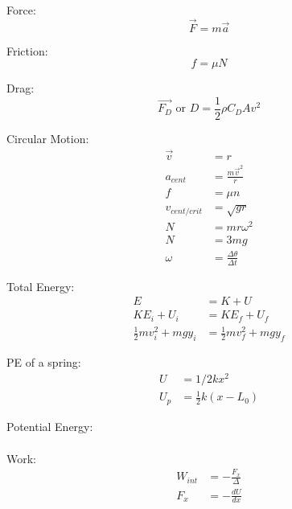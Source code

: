 \documentclass[10pt, letterpaper]{book}
\begin{document}
\begin{multicols*}{2}
        Force:
        \begin{equation}
            \vec{F} = m\vec{a}
        \end{equation}

        Friction:
        \begin{equation}
            f = \mu N
        \end{equation}

        Drag: 
        \begin{equation}
            \vec{F_D}\text{ or }D = \frac{1}{2}\rho C_{D}Av^{2}
        \end{equation}

        Circular Motion:
        \begin{align}
            \vec{v}         & = r                               \\
            a_{cent}        & =\frac{m\vec{v}^{2}}{r}           \\
            f               & = \mu n                           \\
            v_{cent/crit}   & = \sqrt{gr}                       \\
            N               & = mr\omega^{2}                    \\
            N               & = 3mg                             \\
            \omega          & = \frac{\Delta \theta}{\Delta t}  
        \end{align}

        Total Energy:
        \begin{align}
            E   & = K + U   \\
            KE_{i} + U_{i}  & = KE_{f} + U_{f}  \\
            \frac{1}{2}mv^{2}_{i} + mgy_{i} & = \frac{1}{2}mv^{2}_{f} + mgy_{f}
        \end{align}

        PE of a spring:
        \begin{align}
            U     & = 1/2kx^{2}                 \\
            U_{p} & = \frac{1}{2}k(x-L_{0})
        \end{align}

        Potential Energy:
        \begin{align}
        \end{align}

        Work:
        \begin{align}
            W_{int} & = -\frac{F_{x}}{\Delta }   \\
            F_{x}   & = -\frac{dU}{dx}
        \end{align} 


\end{multicols*}
\end{document}
